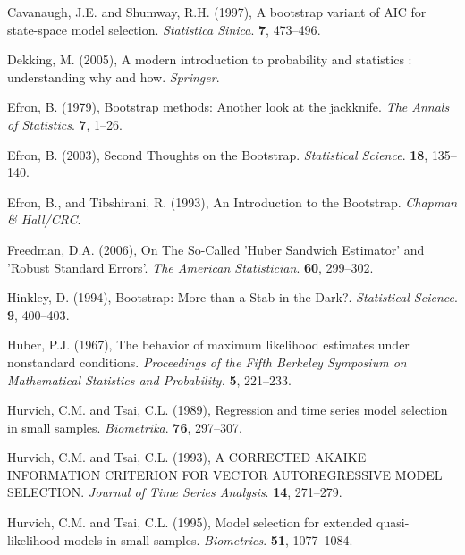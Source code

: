 \phantom{a}

\rff Cavanaugh, J.E. and Shumway, R.H. (1997),
      A bootstrap variant of AIC for state-space model selection.
      {\it Statistica Sinica}.
      {\bf 7}, {473--496}.

\phantom{a}

\rff Dekking, M. (2005),
      A modern introduction to probability and statistics : understanding why and how.
      {\it Springer}.

\phantom{a}

\rff Efron, B. (1979),
      Bootstrap methods: Another look at the jackknife.
      {\it The Annals of Statistics}.
      {\bf 7}, {1--26}.

\phantom{a}

\rff Efron, B. (2003),
      Second Thoughts on the Bootstrap.
      {\it Statistical Science}.
      {\bf 18}, {135--140}.

\phantom{a}

\rff Efron, B., and Tibshirani, R. (1993),
      An Introduction to the Bootstrap.
      {\it Chapman \& Hall/CRC}.

\phantom{a}

\rff Freedman, D.A. (2006),
      On The So-Called 'Huber Sandwich Estimator' and 'Robust Standard Errors'.
      {\it The American Statistician}.
      {\bf 60}, {299--302}.

\phantom{a}

\rff Hinkley, D. (1994),
      Bootstrap: More than a Stab in the Dark?.
      {\it Statistical Science}.
      {\bf 9}, {400--403}.

\phantom{a}

\rff Huber, P.J. (1967),
    The behavior of maximum likelihood estimates under nonstandard conditions.
    {\it Proceedings of the Fifth Berkeley Symposium on Mathematical Statistics and Probability.}
    {\bf 5}, {221--233}.

\phantom{a}

\rff Hurvich, C.M. and Tsai, C.L. (1989),
      Regression and time series model selection in small samples.
      {\it Biometrika}.
      {\bf 76}, {297--307}.

\phantom{a}

\rff Hurvich, C.M. and Tsai, C.L. (1993),
      A CORRECTED AKAIKE INFORMATION CRITERION FOR VECTOR AUTOREGRESSIVE MODEL SELECTION.
      {\it Journal of Time Series Analysis}.
      {\bf 14}, {271--279}.

\phantom{a}

\rff Hurvich, C.M. and Tsai, C.L. (1995),
      Model selection for extended quasi-likelihood models in small samples.
      {\it Biometrics}.
      {\bf 51}, {1077--1084}.

